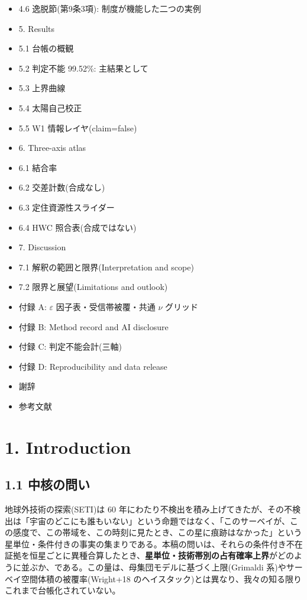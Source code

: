 \documentclass[11pt]{article}
\begin{document}
\begin{itemize}
\item[] \hspace{1.2em}4.6 逸脱節(第9条3項): 制度が機能した二つの実例
\item[] 5. Results
\item[] \hspace{1.2em}5.1 台帳の概観
\item[] \hspace{1.2em}5.2 判定不能 99.52\%: 主結果として
\item[] \hspace{1.2em}5.3 上界曲線
\item[] \hspace{1.2em}5.4 太陽自己校正
\item[] \hspace{1.2em}5.5 W1 情報レイヤ(claim=false)
\item[] 6. Three-axis atlas
\item[] \hspace{1.2em}6.1 結合率
\item[] \hspace{1.2em}6.2 交差計数(合成なし)
\item[] \hspace{1.2em}6.3 定住資源性スライダー
\item[] \hspace{1.2em}6.4 HWC 照合表(合成ではない)
\item[] 7. Discussion
\item[] \hspace{1.2em}7.1 解釈の範囲と限界(Interpretation and scope)
\item[] \hspace{1.2em}7.2 限界と展望(Limitations and outlook)
\item[] 付録 A: \(\varepsilon\) 因子表・受信帯被覆・共通 \(\nu\) グリッド
\item[] 付録 B: Method record and AI disclosure
\item[] 付録 C: 判定不能会計(三軸)
\item[] 付録 D: Reproducibility and data release
\item[] 謝辞
\item[] 参考文献
\end{itemize}
\section*{1. Introduction}

\subsection*{1.1 中核の問い}
\noindent 地球外技術の探索(SETI)は 60 年にわたり不検出を積み上げてきたが、その不検出は「宇宙のどこにも誰もいない」という命題ではなく、「このサーベイが、この感度で、この帯域を、この時刻に見たとき、この星に痕跡はなかった」という星単位・条件付きの事実の集まりである。本稿の問いは、それらの条件付き不在証拠を恒星ごとに異種合算したとき、\textbf{星単位・技術帯別の占有確率上界}がどのように並ぶか、である。この量は、母集団モデルに基づく上限(Grimaldi 系)やサーベイ空間体積の被覆率(Wright+18 のヘイスタック)とは異なり、我々の知る限りこれまで台帳化されていない。\par\smallskip
\end{document}
